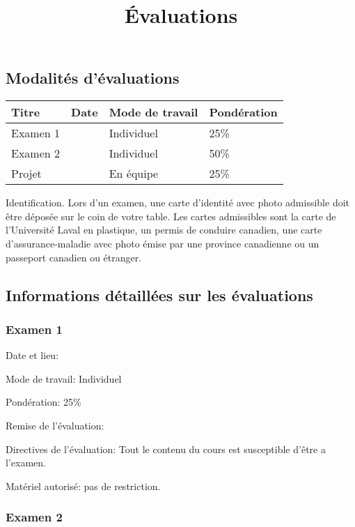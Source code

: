 \documentclass[
  french,
  letterpaper,
  DIV=11,
  numbers=noendperiod]{scrartcl}
\title{Évaluations}
\author{}
\date{}
\begin{document}
\maketitle


\subsection{Modalités d'évaluations}\label{modalituxe9s-duxe9valuations}

\begin{longtable}[]{@{}llll@{}}
\toprule\noalign{}
Titre & Date & Mode de travail & Pondération \\
\midrule\noalign{}
\endhead
\bottomrule\noalign{}
\endlastfoot
Examen 1 & & Individuel & 25\% \\
Examen 2 & & Individuel & 50\% \\
Projet & & En équipe & 25\% \\
\end{longtable}

Identification. Lors d'un examen, une carte d'identité avec photo
admissible doit être déposée sur le coin de votre table. Les cartes
admissibles sont la carte de l'Université Laval en plastique, un permis
de conduire canadien, une carte d'assurance-maladie avec photo émise par
une province canadienne ou un passeport canadien ou étranger.

\subsection{Informations détaillées sur les
évaluations}\label{informations-duxe9tailluxe9es-sur-les-uxe9valuations}

\subsubsection{Examen 1}\label{examen-1}

Date et lieu:

Mode de travail: Individuel

Pondération: 25\%

Remise de l'évaluation:

Directives de l'évaluation: Tout le contenu du cours est susceptible
d'être a l'examen.

Matériel autorisé: pas de restriction.

\subsubsection{Examen 2}\label{examen-2}
\end{document}
